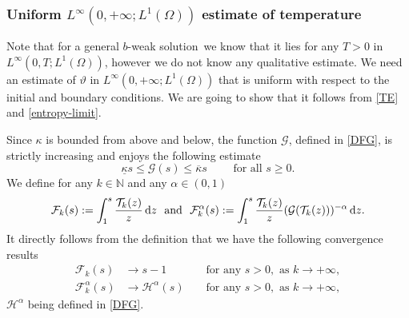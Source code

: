 \documentclass[11pt, a4paper, reqno]{amsart}
\newcommand{\N}{\mathbb N}
\numberwithin{equation}{section}
\newcommand{\thet}{\vartheta}
\newcommand{\G}{\mathcal{G}}
\newcommand{\al}{\alpha}
\newcommand{\bb}{b}
\newcommand{\bws}{$\bb$-weak solution}
\begin{document}
\subsubsection{Uniform $L^\infty(0,+\infty;L^1(\Omega))$ estimate of temperature
}\label{sss:324}
Note that for a general \bws\ we know that it lies for any $T>0$ in $L^\infty(0,T;L^1(\Omega))$, however we do not know any qualitative estimate.  We need an estimate of $\thet$ in $L^\infty(0,+\infty;L^1(\Omega))$ that is uniform with respect to the initial and boundary conditions. We are going to show that it follows from \eqref{TE} and \eqref{entropy-limit}.

Since $\kappa$ is bounded from above and below, the function $\G$, defined in \eqref{DFG}, is strictly increasing and enjoys the following estimate
\begin{equation}\label{bound-G}
\underline{\kappa} s\leq \G(s) \leq \overline{\kappa} s  \qquad \textrm{ for all } s\ge 0.
\end{equation}
We define for any  $k\in \N$ and any $\alpha\in(0,1)$
$$
\mathcal{F}_k(s):=\int_1^s \frac{\mathcal{T}_k(z)}{z} \, {\rm d}z \ \mbox{ and } \ \mathcal{F}_k^\al(s):=\int_1^s \frac{\mathcal{T}_k(z)}{z} (\G(\mathcal{T}_k(z)))^{-\al}\,{\rm d}z.
$$
It directly follows from the definition that we have the following convergence results
\begin{equation}\label{Fmk}
\begin{aligned}
\mathcal{F}_k(s) &\to s-1 &&\mbox{ for any } s>0, \mbox{ as } k\to +\infty,\\
\mathcal{F}_k^\al(s) &\to \mathcal{H}^\al(s)&&\mbox{ for any } s>0, \mbox{ as } k\to +\infty,
\end{aligned}
\end{equation}
$\mathcal{H}^\al$ being defined in \eqref{DFG}.
\end{document}
